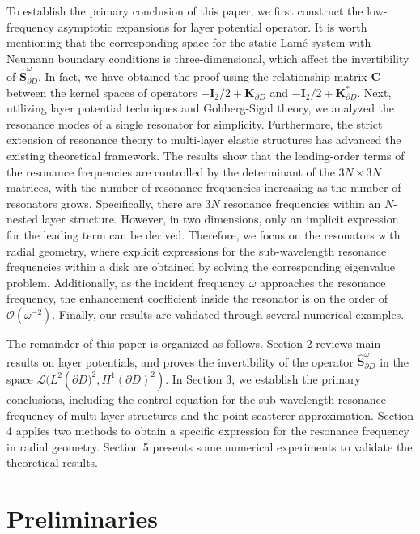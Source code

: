 \documentclass[10pt,reqno,oneside]{amsart}%
\theoremstyle{definition}
\theoremstyle{remark}
\numberwithin{equation}{section}
\numberwithin{equation}{section}
\begin{document}
To establish the primary conclusion of this paper, we first construct the low-frequency asymptotic expansions for layer potential operator. It is worth mentioning that the corresponding space for the static Lam\'e system with Neumann boundary conditions is three-dimensional, which affect the invertibility of $\hat{\mathbf{S}}_{\partial D}^{\omega}$. In fact, we have obtained the proof using the relationship matrix ${\mathbf{C}}$ between the kernel spaces of operators $-\mathbf{I}_2 / 2+\mathbf{K}_{\partial D}$ and $-\mathbf{I}_2 / 2+\mathbf{K}_{\partial D}^{*}$. Next, utilizing layer potential techniques and Gohberg-Sigal theory, we analyzed the resonance modes of a single resonator for simplicity. Furthermore, the strict extension of resonance theory to multi-layer elastic structures has advanced the existing theoretical framework. The results show that the leading-order terms of the resonance frequencies are controlled by the determinant of the $3N \times 3N$ matrices, with the number of resonance frequencies increasing as the number of resonators grows. Specifically, there are $3N$ resonance frequencies within an $N$-nested layer structure. However, in two dimensions, only an implicit expression for the leading term can be derived. Therefore, we focus on the resonators with radial geometry, where explicit expressions for the sub-wavelength resonance frequencies within a disk are obtained by solving the corresponding eigenvalue problem. Additionally, as the incident frequency $\omega$ approaches the resonance frequency, the enhancement coefficient inside the resonator is on the order of  $\mathcal{O}(\omega^{-2})$. Finally, our results are validated through several numerical examples.

The remainder of this paper is organized as follows. Section 2 reviews main results on layer potentials, and proves the invertibility of the operator $\hat{\mathbf{S}}_{\partial D}^{\omega}$ in the space $\mathcal{L}(L^{2}\left(\partial D)^{2},H^{1}(\partial D)^{2}\right)$. In Section 3, we establish the primary conclusions, including the control equation for the sub-wavelength resonance frequency of multi-layer structures and the point scatterer approximation. Section 4 applies two methods to obtain a specific expression for the resonance frequency in radial geometry. Section 5 presents some numerical experiments to validate the theoretical results.


\section{Preliminaries}
\end{document}
